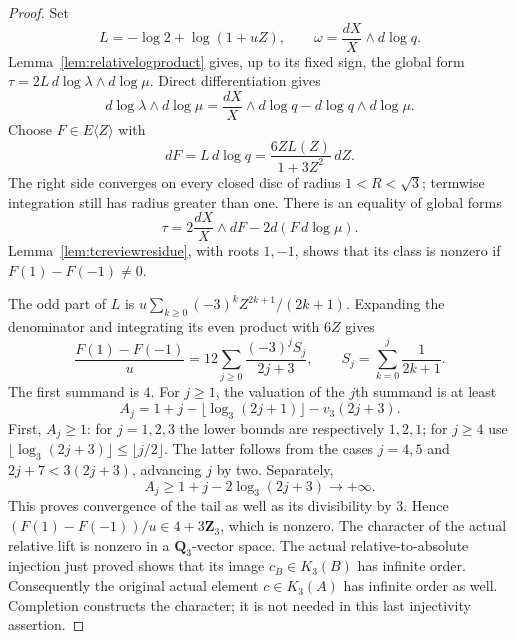 \documentclass[11pt,a4paper]{article}
\theoremstyle{remark}
\begin{document}
\begin{proof}
Set
\[
 L=-\log2+\log(1+uZ),\qquad
 \omega=\frac{dX}{X}\wedge d\log q.
\]
Lemma~\ref{lem:relativelogproduct} gives, up to its fixed sign, the
global form $\tau=2L\,d\log\lambda\wedge d\log\mu$.
Direct differentiation gives
\[
 d\log\lambda\wedge d\log\mu
   =\frac{dX}{X}\wedge d\log q-d\log q\wedge d\log\mu.
\]
Choose $F\in E\langle Z\rangle$ with
\[
 dF=L\,d\log q=\frac{6ZL(Z)}{1+3Z^2}\,dZ.
\]
The right side converges on every closed disc of radius
$1<R<\sqrt3$; termwise integration still has radius greater than one.
There is an equality of global forms
\begin{equation}\label{eq:directtcglobalform}
 \tau=2\frac{dX}{X}\wedge dF-2d(F\,d\log\mu).
\end{equation}
Lemma~\ref{lem:tcreviewresidue}, with roots $1,-1$, shows that its
class is nonzero if $F(1)-F(-1)\ne0$.

The odd part of $L$ is
$u\sum_{k\ge0}(-3)^kZ^{2k+1}/(2k+1)$. Expanding the denominator
and integrating its even product with $6Z$ gives
\[
 \frac{F(1)-F(-1)}u
     =12\sum_{j\ge0}\frac{(-3)^jS_j}{2j+3},
 \qquad S_j=\sum_{k=0}^j\frac1{2k+1}.
\]
The first summand is $4$. For $j\ge1$, the valuation of the $j$th
summand is at least
\[
 A_j=1+j-\lfloor\log_3(2j+1)\rfloor-v_3(2j+3).
\]
First, $A_j\ge1$: for $j=1,2,3$ the lower bounds are respectively
$1,2,1$; for $j\ge4$ use
$\lfloor\log_3(2j+3)\rfloor\le\lfloor j/2\rfloor$.
The latter follows from the cases $j=4,5$ and
$2j+7<3(2j+3)$, advancing $j$ by two. Separately,
\[
 A_j\ge1+j-2\log_3(2j+3)\longrightarrow+\infty.
\]
This proves convergence of the tail as well as its divisibility by
$3$. Hence $(F(1)-F(-1))/u\in4+3\mathbf Z_3$, which is nonzero.
The character of the actual relative lift is nonzero in a
$\mathbf Q_3$-vector space. The actual relative-to-absolute injection
just proved shows that its image $c_B\in K_3(B)$ has infinite order.
Consequently the original actual element $c\in K_3(A)$ has infinite
order as well. Completion constructs the character; it is not needed
in this last injectivity assertion.
\end{proof}
\end{document}
